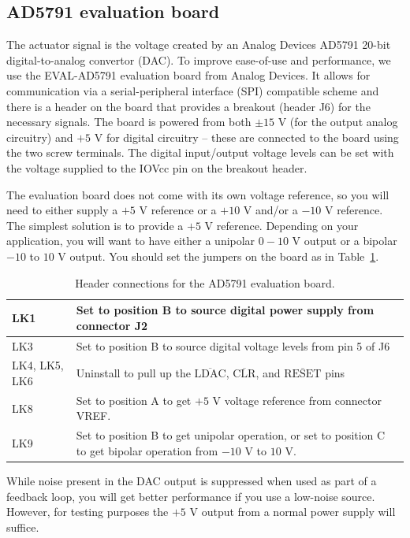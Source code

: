 \documentclass{article}
\begin{document}
\subsection{AD5791 evaluation board}
The actuator signal is the voltage created by an Analog Devices AD5791 20-bit digital-to-analog convertor (DAC).  To improve ease-of-use and performance, we use the EVAL-AD5791 evaluation board from Analog Devices.  It allows for communication via a serial-peripheral interface (SPI) compatible scheme and there is a header on the board that provides a breakout (header J6) for the necessary signals.  The board is powered from both $\pm15$ V (for the output analog circuitry) and $+5$ V for digital circuitry -- these are connected to the board using the two screw terminals.  The digital input/output voltage levels can be set with the voltage supplied to the IOVcc pin on the breakout header.

The evaluation board does not come with its own voltage reference, so you will need to either supply a $+5$ V reference or a $+10$ V and/or a $-10$ V reference.  The simplest solution is to provide a $+5$ V reference.  Depending on your application, you will want to have either a unipolar $0-10$ V output or a bipolar $-10$ to $10$ V output.  You should set the jumpers on the board as in Table~\ref{tb:DACJumper}.
\begin{table}[htbp]
	\centering
	\begin{tabular}{|l|p{10cm}|}
		\hline
		LK1 & Set to position B to source digital power supply from connector J2\\\hline
		LK3 & Set to position B to source digital voltage levels from pin 5 of J6\\\hline
		LK4, LK5, LK6 & Uninstall to pull up the $\overline{\text{LDAC}}$, $\overline{\text{CLR}}$, and $\overline{\text{RESET}}$ pins\\\hline
		LK8 & Set to position A to get $+5$ V voltage reference from connector VREF.\\\hline
		LK9 & Set to position B to get unipolar operation, or set to position C to get bipolar operation from $-10$ V to $10$ V.\\\hline
	\end{tabular}
	\caption{Header connections for the AD5791 evaluation board.}
	\label{tb:DACJumper}
\end{table}

While noise present in the DAC output is suppressed when used as part of a feedback loop, you will get better performance if you use a low-noise source.  However, for testing purposes the $+5$ V output from a normal power supply will suffice.
\end{document}
